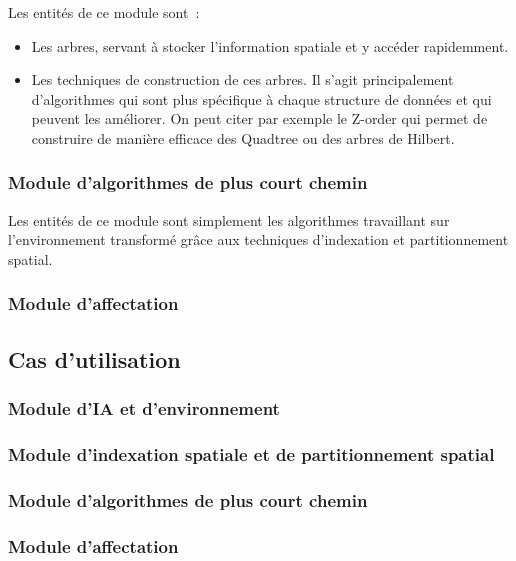 Les entités de ce module sont~:
\begin{itemize}
\setlength{\itemsep}{5pt}
\item Les arbres, servant à stocker l'information spatiale et y accéder rapidemment.
\item Les techniques de construction de ces arbres. Il s'agit principalement d'algorithmes qui sont plus spécifique à chaque structure de données et qui peuvent les améliorer. On peut citer par exemple le Z-order qui permet de construire de manière efficace des Quadtree ou des arbres de Hilbert.
\end{itemize}

%
\subsubsection{Module d'algorithmes de plus court chemin}

Les entités de ce module sont simplement les algorithmes travaillant sur l'environnement transformé grâce aux techniques d'indexation et partitionnement spatial.

%
\subsubsection{Module d'affectation}

%
\subsection{Cas d'utilisation}

\subsubsection{Module d'IA et d'environnement}
\subsubsection{Module d'indexation spatiale et de partitionnement spatial}
\subsubsection{Module d'algorithmes de plus court chemin}
\subsubsection{Module d'affectation}

